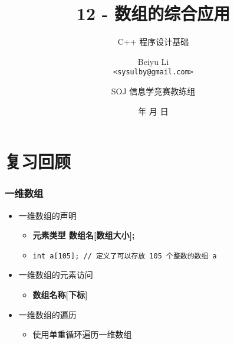 \title[12 - 数组的综合应用]
{12 - 数组的综合应用}

\subtitle{C++ 程序设计基础}

\author[Beiyu Li]
{Beiyu Li\\
\texttt{<sysulby@gmail.com>}}


\date[\today]
{\number\year 年 \number\month 月 \number\day 日}




\author[sysulby]
{SOJ 信息学竞赛教练组}

\begin{frame}
    \titlepage
\end{frame}
\setcounter{framenumber}{0} %


\section{复习回顾}

\begin{frame}[fragile]
    \frametitle{一维数组}

    \begin{itemize}[<+->]
        \item 一维数组的声明
        
            \begin{itemize}
                \item \textbf{元素类型 \enspace 数组名[数组大小];}
                \item \lstinline|int a[105]; // 定义了可以存放 105 个整数的数组 a|
            \end{itemize}

        \item 一维数组的元素访问
        
            \begin{itemize}
                \item \textbf{数组名称[下标]}
            \end{itemize}

        \item 一维数组的遍历
        
            \begin{itemize}
                \item 使用单重循环遍历一维数组
            \end{itemize}

    \end{itemize}
\end{frame}

